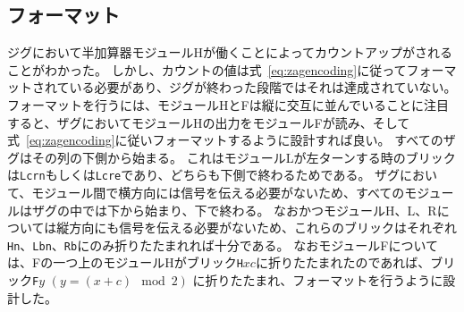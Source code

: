 \documentclass[a4,11pt]{article}
\begin{document}
\subsection{フォーマット}
ジグにおいて半加算器モジュールHが働くことによってカウントアップがされることがわかった。
しかし、カウントの値は式~\eqref{eq:zagencoding}に従ってフォーマットされている必要があり、ジグが終わった段階ではそれは達成されていない。
フォーマットを行うには、モジュールHとFは縦に交互に並んでいることに注目すると、ザグにおいてモジュールHの出力をモジュールFが読み、そして式~\eqref{eq:zagencoding}に従いフォーマットするように設計すれば良い。
すべてのザグはその列の下側から始まる。
これはモジュールLが左ターンする時のブリックは\texttt{Lcrn}もしくは\texttt{Lcre}であり、どちらも下側で終わるためである。
ザグにおいて、モジュール間で横方向には信号を伝える必要がないため、すべてのモジュールはザグの中では下から始まり、下で終わる。
なおかつモジュールH、L、Rについては縦方向にも信号を伝える必要がないため、これらのブリックはそれぞれ\texttt{Hn}、\texttt{Lbn}、\texttt{Rb}にのみ折りたたまれれば十分である。
なおモジュールFについては、Fの一つ上のモジュールHがブリック\texttt{H}$xc$に折りたたまれたのであれば、ブリック\texttt{F}$y$ $(y = (x+c) \mod 2)$ に折りたたまれ、フォーマットを行うように設計した。
\end{document}

